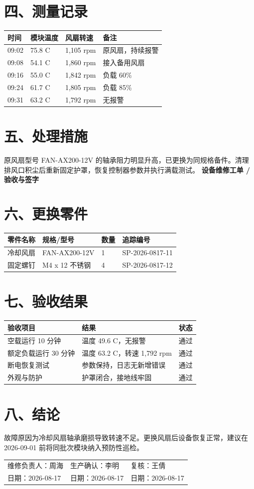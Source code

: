 \documentclass[12pt,a4paper]{article}
\begin{document}
\section*{四、测量记录}
\begin{tabular}{|p{37mm}|p{34mm}|p{34mm}|p{42mm}|}\hline
\rowcolor{gray!15} 时间 & 模块温度 & 风扇转速 & 备注\\\hline
09:02 & 75.8 C & 1,105 rpm & 原风扇，持续报警\\\hline
09:08 & 54.1 C & 1,860 rpm & 接入备用风扇\\\hline
09:16 & 55.0 C & 1,842 rpm & 负载 60\%\\\hline
09:24 & 61.7 C & 1,805 rpm & 负载 85\%\\\hline
09:31 & 63.2 C & 1,792 rpm & 无报警\\\hline
\end{tabular}
\section*{五、处理措施}
原风扇型号 FAN-AX200-12V 的轴承阻力明显升高，已更换为同规格备件。清理排风口积尘后重新固定护罩，恢复控制器参数并执行满载测试。
\newpage
{\fontsize{18}{22}\selectfont\bfseries 设备维修工单 / 验收与签字}\par\vspace{8mm}
\section*{六、更换零件}
\begin{tabular}{|p{40mm}|p{38mm}|p{28mm}|p{38mm}|}\hline
\rowcolor{gray!15} 零件名称 & 规格/型号 & 数量 & 追踪编号\\\hline
冷却风扇 & FAN-AX200-12V & 1 & SP-2026-0817-11\\\hline
固定螺钉 & M4 x 12 不锈钢 & 4 & SP-2026-0817-12\\\hline
\end{tabular}
\section*{七、验收结果}
\begin{tabular}{|p{58mm}|p{56mm}|p{28mm}|}\hline
\rowcolor{gray!15} 验收项目 & 结果 & 状态\\\hline
空载运行 10 分钟 & 温度 49.6 C，无报警 & 通过\\\hline
额定负载运行 30 分钟 & 温度 63.2 C，转速 1,792 rpm & 通过\\\hline
断电恢复测试 & 参数保持，日志无新增错误 & 通过\\\hline
外观与防护 & 护罩闭合，接地线牢固 & 通过\\\hline
\end{tabular}
\section*{八、结论}
故障原因为冷却风扇轴承磨损导致转速不足。更换风扇后设备恢复正常，建议在 2026-09-01 前将同批次模块纳入预防性巡检。
\vspace{8mm}\par\noindent
\begin{tabular}{p{50mm}p{50mm}p{50mm}}
维修负责人：周海 & 生产确认：李明 & 复核：王倩\\[12mm]
日期：2026-08-17 & 日期：2026-08-17 & 日期：2026-08-17
\end{tabular}
\end{document}
